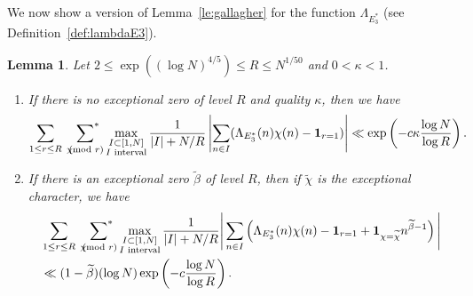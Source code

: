 \documentclass[12pt]{amsart}
\newtheorem{lemma}[theorem]{Lemma}
\theoremstyle{definition}
\theoremstyle{remark}
\numberwithin{equation}{section}
\newcommand{\asum}{\sideset{}{^{\ast}}\sum}
\newcommand{\1}{\mathbf{1}}
\let\oldpmod\pmod
\renewcommand{\pmod}[1]{\hspace{-0.12cm}\oldpmod {#1}}
\begin{document}
We now show a version of Lemma~\ref{le:gallagher} for the function $\Lambda_{E_3^*}$ (see Definition~\ref{def:lambdaE3}).
\begin{lemma}\label{le:gallagherE3}
   Let $2\leq \exp((\log N)^{4/5}) \leq R \leq N^{1/50}$ and $0<\kappa<1$. 
	\begin{enumerate}
		\item  If there is no exceptional zero of level $R$ and quality $\kappa$, then we have
		  \begin{align*}
			\sum_{1\leq r\leq R}\,\,\,\asum_{\chi\pmod r} \max_{\substack{I\subset [1,N]\\I \textnormal{ interval}}}\frac{1}{|I|+N/R}\left|\sum_{n\in I}(\Lambda_{E_3^{*}}(n)\chi(n)-\1_{r=1})\right|\ll \exp\left(-c \kappa \frac{\log N}{\log R}\right).
		  \end{align*}
			
		  \item  If there is an exceptional zero $\widetilde{\beta}$ of level $R$, then if $\widetilde{\chi}$ is the exceptional character, we have
		      \begin{align}\label{eq:Gallagher2}\begin{split}
				&\sum_{1\leq r\leq R}\,\,\,\asum_{\chi\pmod r}\max_{\substack{I\subset [1,N]\\I \textnormal{ interval}}}\frac{1}{|I|+N/R} \Bigg|\sum_{n\in I}\left(\Lambda_{E_3^{*}}(n)\chi(n)-\1_{r=1}+\1_{\chi=\widetilde{\chi}}n^{\widetilde{\beta}-1}\right)\Bigg|\\
				&\ll  (1-\widetilde{\beta})(\log N)\exp\left(-c \frac{\log N}{\log R}\right).
				\end{split}
			\end{align} 
	\end{enumerate}
\end{lemma}
\end{document}
